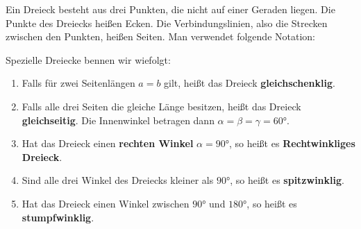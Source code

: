 \documentclass[ngerman, 12pt]{nssheetxea}
\begin{document}
\begin{definition}
Ein Dreieck besteht aus drei Punkten, die nicht auf einer Geraden liegen. Die Punkte des Dreiecks heißen Ecken. Die Verbindungslinien, also die Strecken zwischen den Punkten, heißen Seiten. Man verwendet folgende Notation:
\begin{center}
\end{center}
Spezielle Dreiecke bennen wir wiefolgt:
\begin{enumerate}
\item Falls für zwei Seitenlängen $a=b$ gilt, heißt das Dreieck \textbf{gleichschenklig}.
\item Falls alle drei Seiten die gleiche Länge besitzen, heißt das Dreieck \textbf{gleichseitig}. Die Innenwinkel betragen dann $\alpha = \beta = \gamma = \ang{60}$. 
\item Hat das Dreieck einen \textbf{rechten Winkel} $\alpha=\ang{90}$, so heißt es \textbf{Rechtwinkliges Dreieck}. 
\item Sind alle drei Winkel des Dreiecks kleiner als $\ang{90}$, so heißt es \textbf{spitzwinklig}. 
\item Hat das Dreieck einen Winkel zwischen $\ang{90}$ und $\ang{180}$, so heißt es \textbf{stumpfwinklig}. 
\end{enumerate}
\end{definition}
\end{document}
